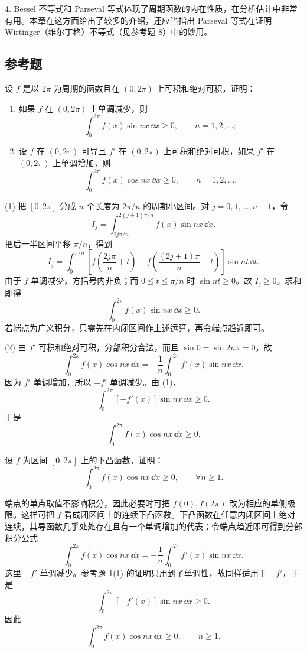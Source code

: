 4. Bessel 不等式和 Parseval 等式体现了周期函数的内在性质，在分析估计中非常有用。本章在这方面给出了较多的介绍，还应当指出 Parseval 等式在证明 Wirtinger（维尔丁格）不等式（见参考题 8）中的妙用。

\subsection{参考题}

\begin{xreferenceproblem}[1]
设 $f$ 是以 $2\pi$ 为周期的函数且在 $(0,2\pi)$ 上可积和绝对可积，证明：
  \begin{enumerate}[label=(\arabic*)]
    \item 如果 $f$ 在 $(0,2\pi)$ 上单调减少，则
    \[
      \int_0^{2\pi}f(x)\sin nx\,\dd x\ge0,\qquad n=1,2,\ldots;
    \]
    \item 设 $f$ 在 $(0,2\pi)$ 可导且 $f'$ 在 $(0,2\pi)$ 上可积和绝对可积，如果 $f'$ 在 $(0,2\pi)$ 上单调增加，则
    \[
      \int_0^{2\pi}f(x)\cos nx\,\dd x\ge0,\qquad n=1,2,\ldots.
    \]
  \end{enumerate}
\end{xreferenceproblem}
\begin{xsolution}
(1) 把 $[0,2\pi]$ 分成 $n$ 个长度为 $2\pi/n$ 的周期小区间。对 $j=0,1,\ldots,n-1$，令
\[
  I_j=\int_{2j\pi/n}^{2(j+1)\pi/n}f(x)\sin nx\,\dd x.
\]
把后一半区间平移 $\pi/n$，得到
\[
  I_j=\int_0^{\pi/n}
  \left[f\left(\frac{2j\pi}{n}+t\right)
  -f\left(\frac{(2j+1)\pi}{n}+t\right)\right]\sin nt\,\dd t.
\]
由于 $f$ 单调减少，方括号内非负；而 $0\le t\le\pi/n$ 时 $\sin nt\ge0$。故 $I_j\ge0$。求和即得
\[
  \boxed{\displaystyle
  \int_0^{2\pi}f(x)\sin nx\,\dd x\ge0}.
\]
若端点为广义积分，只需先在内闭区间作上述运算，再令端点趋近即可。

(2) 由 $f'$ 可积和绝对可积，分部积分合法，而且 $\sin0=\sin2n\pi=0$，故
\[
  \int_0^{2\pi}f(x)\cos nx\,\dd x
  =-\frac1n\int_0^{2\pi}f'(x)\sin nx\,\dd x.
\]
因为 $f'$ 单调增加，所以 $-f'$ 单调减少。由 (1)，
\[
  \int_0^{2\pi}[-f'(x)]\sin nx\,\dd x\ge0.
\]
于是
\[
  \boxed{\displaystyle
  \int_0^{2\pi}f(x)\cos nx\,\dd x\ge0}.
\]
\end{xsolution}


\begin{xreferenceproblem}[2]
设 $f$ 为区间 $[0,2\pi]$ 上的下凸函数，证明：
  \[
    \int_0^{2\pi}f(x)\cos nx\,\dd x\ge0,\qquad \forall n\ge1.
  \]
\end{xreferenceproblem}
\begin{xsolution}
端点的单点取值不影响积分，因此必要时可把 $f(0),f(2\pi)$ 改为相应的单侧极限。这样可把 $f$ 看成闭区间上的连续下凸函数。下凸函数在任意内闭区间上绝对连续，其导函数几乎处处存在且有一个单调增加的代表；令端点趋近即可得到分部积分公式
\[
  \int_0^{2\pi}f(x)\cos nx\,\dd x
  =-\frac1n\int_0^{2\pi}f'(x)\sin nx\,\dd x.
\]
这里 $-f'$ 单调减少。参考题 1(1) 的证明只用到了单调性，故同样适用于 $-f'$，于是
\[
  \int_0^{2\pi}[-f'(x)]\sin nx\,\dd x\ge0.
\]
因此
\[
  \boxed{\displaystyle
  \int_0^{2\pi}f(x)\cos nx\,\dd x\ge0,\qquad n\ge1 }.
\]
\end{xsolution}


